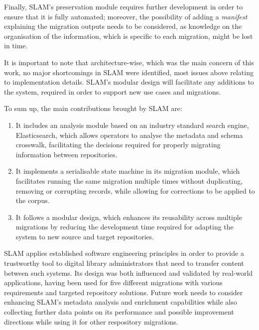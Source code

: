 Finally, SLAM's preservation module requires further development in order to ensure that it is fully automated; moreover, the possibility of adding a \emph{manifest} explaining the migration outputs needs to be considered, as knowledge on the organisation of the information, which is specific to each migration, might be lost in time.

It is important to note that architecture-wise, which was the main concern of this work, no major shortcomings in SLAM were identified, most issues above relating to implementation details. SLAM's modular design will facilitate any additions to the system, required in order to support new use cases and migrations.

To sum up, the main contributions brought by SLAM are:
\begin{enumerate}
    \item It includes an analysis module based on an industry standard search engine, Elasticsearch, which allows operators to analyse the metadata and schema crosswalk, facilitating the decisions required for properly migrating information between repositories.
    \item It implements a serialisable state machine in its migration module, which facilitates running the same migration multiple times without duplicating, removing or corrupting records, while allowing for corrections to be applied to the corpus.
    \item It follows a modular design, which enhances its reusability across multiple migrations by reducing the development time required for adapting the system to new source and target repositories.
\end{enumerate}

SLAM applies established software engineering principles in order to provide a trustworthy tool to digital library administrators that need to transfer content between such systems. Its design was both influenced and validated by real-world applications, having been used for five different migrations with various requirements and targeted repository solutions. Future work needs to consider enhancing SLAM's metadata analysis and enrichment capabilities while also collecting further data points on its performance and possible improvement directions while using it for other respository migrations.